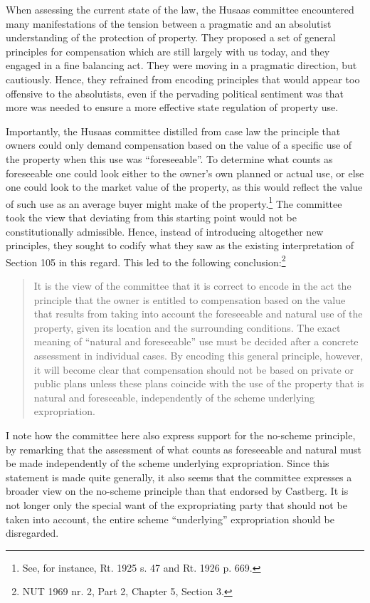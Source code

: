 When assessing the current state of the law, the Husaas committee encountered many manifestations of the tension between a pragmatic and an absolutist understanding of the protection of property. They proposed a set of general principles for compensation which are still largely with us today, and they engaged in a fine balancing act. They were moving in a pragmatic direction, but cautiously. Hence, they refrained from encoding principles that would appear too offensive to the absolutists, even if the pervading political sentiment was that more was needed to ensure a more effective state regulation of property use.

Importantly, the Husaas committee distilled from case law the principle that owners could only demand compensation based on the value of a specific use of the property when this use was ``foreseeable''. To determine what counts as foreseeable one could look either to the owner's own planned or actual use, or else one could look to the market value of the property, as this would reflect the value of such use as an average buyer might make of the property.\footnote{See, for instance, Rt. 1925 s. 47 and Rt. 1926 p. 669.} The committee took the view that deviating from this starting point would not be constitutionally admissible. Hence, instead of introducing altogether new principles, they sought to codify what they saw as the existing interpretation of Section 105 in this regard. This led to the following conclusion:\footnote{NUT 1969 nr. 2, Part 2, Chapter 5, Section 3.}

\begin{quote}
It is the view of the committee that it is correct to encode in the act the principle that the owner is entitled to compensation based on the value that results from taking into account the foreseeable and natural use of the property, given its location and the surrounding conditions. The exact meaning of ``natural and foreseeable'' use must be decided after a concrete assessment in individual cases. By encoding this general principle, however, it will become clear that compensation should not be based on private or public plans unless these plans coincide with the use of the property that is natural and foreseeable, independently of the scheme underlying expropriation.
\end{quote}

I note how the committee here also express support for the no-scheme principle, by remarking that the assessment of what counts as foreseeable and natural must be made independently of the scheme underlying expropriation. Since this statement is made quite generally, it also seems that the committee expresses a broader view on the no-scheme principle than that endorsed by Castberg. It is not longer only the special want of the expropriating party that should not be taken into account, the entire scheme ``underlying'' expropriation should be disregarded.

